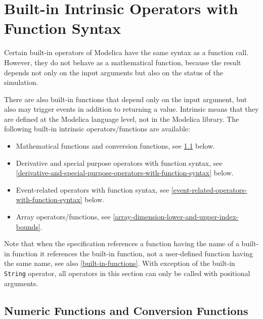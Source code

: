 \section{Built-in Intrinsic Operators with Function Syntax}\label{built-in-intrinsic-operators-with-function-syntax}

Certain built-in operators of Modelica have the same syntax as a
function call. However, they do not behave as a mathematical function,
because the result depends not only on the input arguments but also on
the status of the simulation.

There are also built-in functions that depend only on the input
argument, but also may trigger events in addition to returning a value.
Intrinsic means that they are defined at the Modelica language level,
not in the Modelica library. The following built-in intrinsic
operators/functions are available:
\begin{itemize}
\item
  Mathematical functions and conversion functions, see \cref{numeric-functions-and-conversion-functions}
  below.
\item
  Derivative and special purpose operators with function syntax, see
  \cref{derivative-and-special-purpose-operators-with-function-syntax} below.
\item
  Event-related operators with function syntax, see \cref{event-related-operators-with-function-syntax} below.
\item
  Array operators/functions, see \cref{array-dimension-lower-and-upper-index-bounds}.
\end{itemize}

Note that when the specification references a function having the name
of a built-in function it references the built-in function, not a
user-defined function having the same name, see also \cref{built-in-functions}. With
exception of the built-in \lstinline!String! operator, all operators in this section
can only be called with positional arguments.

\subsection{Numeric Functions and Conversion Functions}\label{numeric-functions-and-conversion-functions}

